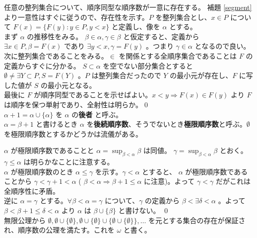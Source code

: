 \documentclass[dvipdfmx,a4paper]{jsreport}
\makeatletter
\theoremstyle{definition}
\let\sectionorig\section
\def\@sectionorig#1{\sectionorig*{\MakeUppercase{#1}}}
\def\@@sectionorig#1{\sectionorig{\MakeUppercase{#1}}}
\renewcommand{\section}{\@ifstar{\@sectionorig}{\@@sectionorig}}
\makeatother
\begin{document}
\thm 任意の整列集合について、順序同型な順序数が一意に存在する。
\prf 補題 \ref{segment} より一意性はすぐに従うので、存在性を示す。$P$ を整列集合とし、$x \in P$ について $F(x)=\{F(y) \colon y \in P,y<x\}$ と定義し、像を $\alpha$ とする。\\
まず $\alpha$ の推移性をみる。 $\beta \in \alpha,\gamma \in \beta$ と仮定すると、定義から $\exists x \in P,\beta=F(x)$ であり $\exists y<x,\gamma=F(y)$ 。つまり $\gamma \in \alpha$ となるので良い。\\
次に整列集合であることをみる。$\in$ を関係とする全順序集合であることは $F$ の定義からすぐに分かる。 $S \subset \alpha$ を空でない部分集合とすると $\emptyset \neq \exists Y \subset P,S=F(Y)$ 。$P$ は整列集合だったので $Y$ の最小元が存在し、$F$ に写した値が $S$ の最小元となる。\\
最後に $F$ が順序同型であることを示せばよい。$x<y \Rightarrow F(x) \in F(y)$ より $F$ は順序を保つ単射であり、全射性は明らか。\qed \\

 $\alpha+1=\alpha\cup \{\alpha\}$ を $\alpha$ の\textbf{後者} と呼ぶ。\\
$\alpha=\beta+1$ と書けるとき $\alpha$ を\textbf{後続順序数}、そうでないとき\textbf{極限順序数}と呼ぶ。$\emptyset$ を極限順序数とするかどうかは流儀がある。

\lem $\alpha$ が極限順序数であることと $\alpha=\sup_{\beta<\alpha}\beta$ は同値。
\prf $\gamma=\sup_{\beta<\alpha}\beta$ とおく。 $\gamma \leq \alpha$ は明らかなことに注意する。\\
$\alpha$ が極限順序数のとき $\alpha \leq \gamma$ を示す。$\gamma<\alpha$ とすると、 $\alpha$ が極限順序数であることから $\gamma<\gamma+1<\alpha$ ( $\beta<\alpha \Rightarrow \beta+1 \leq \alpha$ に注意)。よって $\gamma<\gamma$ だがこれは全順序性に矛盾。\\
逆に $\alpha=\gamma$ とする。$\forall \beta< \alpha=\gamma$ について、$\gamma$ の定義から $\beta<\exists \delta<\alpha$ 。よって $\beta<\beta+1 \leq \delta<\alpha$ より $\alpha$ は $\beta\cup \{\beta\}$ と書けない。 \qed \\

 無限公理から $\emptyset,\emptyset\cup\{\emptyset\},\emptyset\cup\{\emptyset\}\cup\{\emptyset\cup\{\emptyset\}\},\ldots$ を元とする集合の存在が保証され、順序数の公理を満たす。これを $\omega$ と書く。 \\

\section{順序数の算法}
\end{document}
